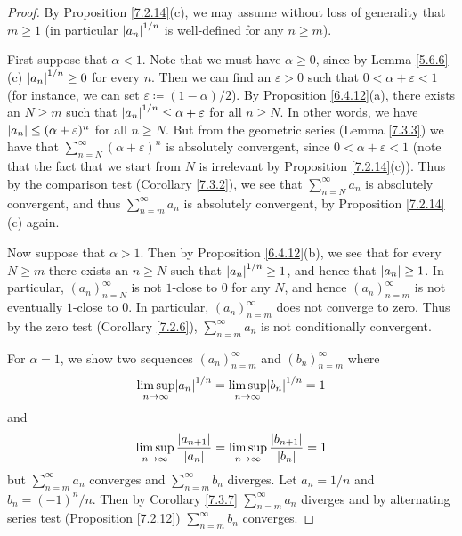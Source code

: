 \begin{proof}
    By Proposition \ref{7.2.14}(c), we may assume without loss of generality that \(m \geq 1\)
    (in particular \(\left\lvert a_n\right\rvert^{1 / n}\) is well-defined for any \(n \geq m\)).

    First suppose that \(\alpha < 1\).
    Note that we must have \(\alpha \geq 0\), since by Lemma \ref{5.6.6}(c) \(\left\lvert a_n\right\rvert^{1 / n} \geq 0\) for every \(n\).
    Then we can find an \(\varepsilon > 0\) such that \(0 < \alpha + \varepsilon < 1\) (for instance, we can set \(\varepsilon \coloneqq (1 - \alpha) / 2\)).
    By Proposition \ref{6.4.12}(a), there exists an \(N \geq m\) such that \(\left\lvert a_n\right\rvert^{1 / n} \leq \alpha + \varepsilon\) for all \(n \geq N\).
    In other words, we have \(\left\lvert a_n\right\rvert \leq (\alpha + \varepsilon)^n\) for all \(n \geq N\).
    But from the geometric series (Lemma \ref{7.3.3}) we have that \(\sum_{n = N}^\infty (\alpha + \varepsilon)^n\) is absolutely convergent, since \(0 < \alpha + \varepsilon < 1\)
    (note that the fact that we start from \(N\) is irrelevant by Proposition \ref{7.2.14}(c)).
    Thus by the comparison test (Corollary \ref{7.3.2}), we see that \(\sum_{n = N}^\infty a_n\) is absolutely convergent, and thus \(\sum_{n = m}^\infty a_n\) is absolutely convergent, by Proposition \ref{7.2.14}(c) again.

    Now suppose that \(\alpha > 1\).
    Then by Proposition \ref{6.4.12}(b), we see that for every \(N \geq m\) there exists an \(n \geq N\) such that \(\left\lvert a_n\right\rvert^{1 / n} \geq 1\), and hence that \(\left\lvert a_n\right\rvert \geq 1\).
    In particular, \((a_n)_{n = N}^\infty\) is not \(1\)-close to \(0\) for any \(N\), and hence \((a_n)_{n = m}^\infty\) is not eventually \(1\)-close to \(0\).
    In particular, \((a_n)_{n = m}^\infty\) does not converge to zero.
    Thus by the zero test (Corollary \ref{7.2.6}), \(\sum_{n = m}^\infty a_n\) is not conditionally convergent.

    For \(\alpha = 1\), we show two sequences \((a_n)_{n = m}^\infty\) and \((b_n)_{n = m}^\infty\) where
    \[
        \limsup_{n \to \infty} \abs{a_n}^{1 / n} = \limsup_{n \to \infty} \abs{b_n}^{1 / n} = 1
    \]
    and
    \[
        \limsup_{n \to \infty} \frac{\left\lvert a_{n + 1}\right\rvert}{\left\lvert a_n\right\rvert} = \limsup_{n \to \infty} \frac{\left\lvert b_{n + 1}\right\rvert}{\left\lvert b_n\right\rvert} = 1
    \]
    but \(\sum_{n = m}^\infty a_n\) converges and \(\sum_{n = m}^\infty b_n\) diverges.
    Let \(a_n = 1 / n\) and \(b_n = (-1)^n / n\).
    Then by Corollary \ref{7.3.7} \(\sum_{n = m}^\infty a_n\) diverges and by alternating series test (Proposition \ref{7.2.12}) \(\sum_{n = m}^\infty b_n\) converges.


\end{proof}
